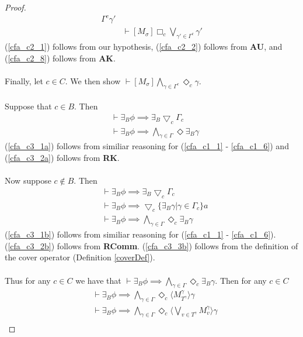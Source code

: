 \documentclass[12pt, a4paper, titlepage]{article}
\numberwithin{equation}{section}
\newcommand{\cover}{\bigtriangledown}
\newcommand{\sqex}[1]{[{#1}]}
\newcommand{\anex}[1]{\langle {#1} \rangle}
\newcommand{\axAK}{{\bf AK}}
\newcommand{\axAU}{{\bf AU}}
\newcommand{\axRK}{{\bf RK}}
\newcommand{\axRComm}{{\bf RComm}}
\begin{document}
\begin{proof}
\begin{align}
{		\Gamma^c} \gamma'\label{cfa_c2_8} \\
	& \vdash \sqex{M_\sigma} \Box_c \bigvee_{\gamma' \in \Gamma^c} \gamma'\label{cfa_c2_9} 
\end{align}
(\ref{cfa_c2_1}) follows from our hypothesis, (\ref{cfa_c2_2}) follows from \axAU, and (\ref{cfa_c2_8})
	follows from \axAK.\\
\\
Finally, let $c \in C$. We then show $\vdash \sqex{M_\sigma}\bigwedge_{\gamma \in \Gamma^c}
\Diamond_c \gamma$.\\
\\
Suppose that $c \in B$.
Then
\begin{align}
	& \vdash \exists_B \phi \implies \exists_B \cover_c \Gamma_c \label{cfa_c3_1a}\\
	& \vdash \exists_B \phi \implies \bigwedge_{\gamma \in \Gamma} \Diamond \exists_B
	\gamma\label{cfa_c3_2a}
\end{align}
(\ref{cfa_c3_1a}) follows from similiar reasoning for (\ref{cfa_c1_1} - \ref{cfa_c1_6}) and
(\ref{cfa_c3_2a}) follows from \axRK.\\
\\
Now suppose $c \notin B$.
Then
\begin{align}
	& \vdash \exists_B \phi \implies \exists_B \cover_c \Gamma_c \label{cfa_c3_1b}\\
	& \vdash \exists_B \phi \implies \cover_c \{\exists_B \gamma | \gamma \in \Gamma_c \}a
	\label{cfa_c3_2b}\\
	& \vdash \exists_B \phi \implies \bigwedge_{\gamma \in \Gamma} \Diamond_c \exists_B \gamma
	\label{cfa_c3_3b}
\end{align}
(\ref{cfa_c3_1b}) follows from similiar reasoning for (\ref{cfa_c1_1} - \ref{cfa_c1_6}).
(\ref{cfa_c3_2b}) follows from \axRComm.
(\ref{cfa_c3_3b}) follows from the definition of the cover operator (Definition \ref{coverDef}).\\
\\
Thus for any $c \in C$ we have that $\vdash \exists_B \phi \implies \bigwedge_{\gamma \in \Gamma}
\Diamond_c \exists_B \gamma$.
Then for any $c \in C$
\begin{align}
	& \vdash \exists_B \phi \implies \bigwedge_{\gamma \in \Gamma} \Diamond_c \anex{
	M^\gamma_{T^{\gamma}} } \gamma\label{cfa_c3_3}\\
	& \vdash \exists_B \phi \implies \bigwedge_{\gamma \in \Gamma} \Diamond_c \anex{
	\bigvee_{v \in T^\gamma} M^\gamma_{v} } \gamma\label{cfa_c3_4}\\

\end{align}
\end{proof}
\end{document}
